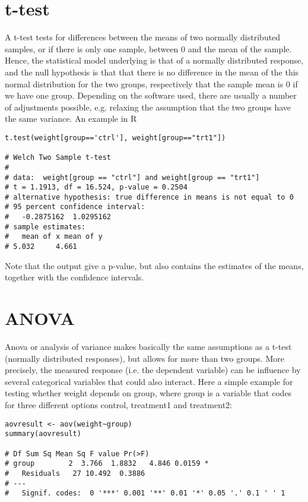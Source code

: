 \documentclass[a4paper,twoside]{tufte-book} %
\begin{document}
\section{t-test}

A t-test tests for differences between the means of two normally distributed samples, or if there is only one sample, between 0 and the mean of the sample. Hence, the statistical model underlying is that of a normally distributed response, and the null hypothesis is that that there is no difference in the mean of the this normal distribution for the two groups, respectively that the sample mean is 0 if we have one group. Depending on the software used, there are usually a number of adjustments possible, e.g. relaxing the assumption that the two groups have the same variance. An example in R

\begin{lstlisting}
t.test(weight[group=='ctrl'], weight[group=="trt1"])

# Welch Two Sample t-test
# 
# data:  weight[group == "ctrl"] and weight[group == "trt1"] 
# t = 1.1913, df = 16.524, p-value = 0.2504
# alternative hypothesis: true difference in means is not equal to 0 
# 95 percent confidence interval:
#   -0.2875162  1.0295162 
# sample estimates:
#   mean of x mean of y 
# 5.032     4.661 
\end{lstlisting}

Note that the output give a p-value, but also contains the estimates of the means, together with the confidence intervals. 

\section{ANOVA}

Anova or analysis of variance makes basically the same assumptions as a t-test (normally distributed responses), but allows for more than two groups. More precisely, the measured response (i.e. the dependent variable) can be influence by several categorical variables that could also interact. Here a simple example for testing whether weight depends on group, where group is a variable that codes for three different options control, treatment1 and treatment2:

\begin{lstlisting}
aovresult <- aov(weight~group)
summary(aovresult)

# Df Sum Sq Mean Sq F value Pr(>F)  
# group        2  3.766  1.8832   4.846 0.0159 *
#   Residuals   27 10.492  0.3886                 
# ---
#   Signif. codes:  0 '***' 0.001 '**' 0.01 '*' 0.05 '.' 0.1 ' ' 1
\end{lstlisting}
\end{document}
